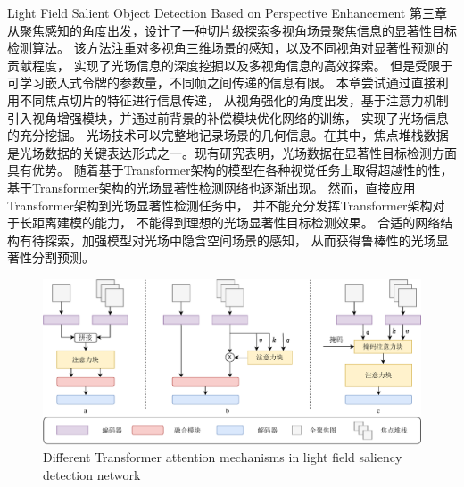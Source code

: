 %
%
%
%
%
%
%
%
%
%





{Light Field Salient Object Detection Based on Perspective Enhancement }
\label{chap:part4}
第三章从聚焦感知的角度出发，设计了一种切片级探索多视角场景聚焦信息的显著性目标检测算法。
该方法注重对多视角三维场景的感知，以及不同视角对显著性预测的贡献程度，
实现了光场信息的深度挖掘以及多视角信息的高效探索。
但是受限于可学习嵌入式令牌的参数量，不同帧之间传递的信息有限。
本章尝试通过直接利用不同焦点切片的特征进行信息传递，
从视角强化的角度出发，基于注意力机制引入视角增强模块，并通过前背景的补偿模块优化网络的训练，
实现了光场信息的充分挖掘。
%
%
%
%
光场技术可以完整地记录场景的几何信息。在其中，焦点堆栈数据是光场数据的关键表达形式之一。现有研究表明，光场数据在显著性目标检测方面具有优势。
随着基于Transformer架构的模型在各种视觉任务上取得超越性的性，
基于Transformer架构的光场显著性检测网络也逐渐出现。
然而，直接应用Transformer架构到光场显著性检测任务中，
并不能充分发挥Transformer架构对于长距离建模的能力，
不能得到理想的光场显著性目标检测效果。
合适的网络结构有待探索，加强模型对光场中隐含空间场景的感知，
从而获得鲁棒性的光场显著性分割预测。
\begin{figure}[!ht]
	\centering
	\includegraphics[width=0.95\linewidth]{figures/chapter4/task2_ins.drawio}
	{Different Transformer attention mechanisms in light field saliency detection network}  
	\label{cpt4_fig1:task2_ins}
\end{figure}
